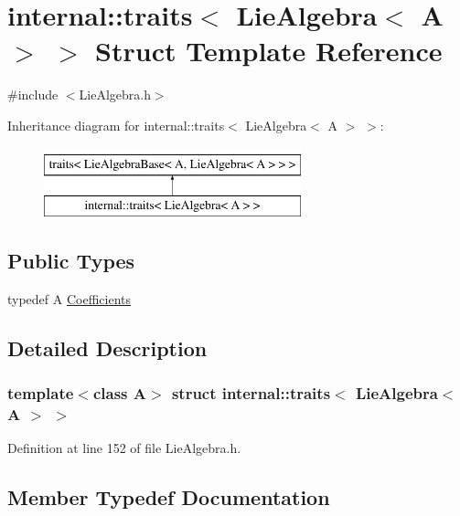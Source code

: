 \hypertarget{structinternal_1_1traits_3_01_lie_algebra_3_01_a_01_4_01_4}{}\section{internal\+:\+:traits$<$ Lie\+Algebra$<$ A $>$ $>$ Struct Template Reference}
\label{structinternal_1_1traits_3_01_lie_algebra_3_01_a_01_4_01_4}


{\ttfamily \#include $<$Lie\+Algebra.\+h$>$}

Inheritance diagram for internal\+:\+:traits$<$ Lie\+Algebra$<$ A $>$ $>$\+:\begin{figure}[H]
\begin{center}
\leavevmode
\includegraphics[height=2.000000cm]{structinternal_1_1traits_3_01_lie_algebra_3_01_a_01_4_01_4}
\end{center}
\end{figure}
\subsection*{Public Types}
\begin{DoxyCompactItemize}
\item 
typedef A \hyperlink{structinternal_1_1traits_3_01_lie_algebra_3_01_a_01_4_01_4_a001bd1e57bb80cc75d486c92b152d2f2}{Coefficients}
\end{DoxyCompactItemize}


\subsection{Detailed Description}
\subsubsection*{template$<$class A$>$\newline
struct internal\+::traits$<$ Lie\+Algebra$<$ A $>$ $>$}



Definition at line 152 of file Lie\+Algebra.\+h.



\subsection{Member Typedef Documentation}
\hypertarget{structinternal_1_1traits_3_01_lie_algebra_3_01_a_01_4_01_4_a001bd1e57bb80cc75d486c92b152d2f2}{}\label{structinternal_1_1traits_3_01_lie_algebra_3_01_a_01_4_01_4_a001bd1e57bb80cc75d486c92b152d2f2} 
